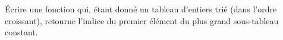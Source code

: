\exer{}
\setcounter{numques}{0}

Écrire une fonction qui, étant donné un tableau d'entiers trié (dans l'ordre
croissant), retourne l'indice du premier élément du plus grand sous-tableau
constant.